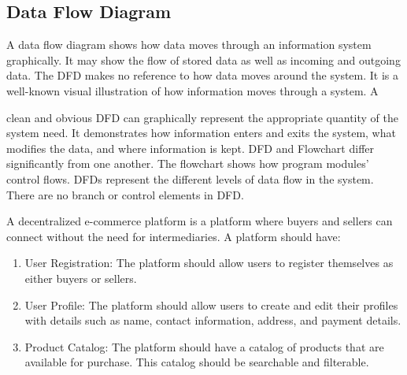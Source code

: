 \documentclass[a4paper,11pt]{article}
\begin{document}
\begin{center}
 \section{Data Flow Diagram}
A data flow diagram shows how data moves through an information system graphically. It may show the flow of stored data as well as incoming and outgoing data. The DFD makes no reference to how data moves around the system. It is a well-known visual illustration of how information moves through a system. A

clean and obvious DFD can graphically represent the appropriate quantity of the system need. It demonstrates how information enters and exits the system, what modifies the data, and where information is kept.
DFD and Flowchart differ significantly from one another. The flowchart shows how program modules' control flows. DFDs represent the different levels of data flow in the system. There are no branch or control elements in DFD.
 
 A decentralized e-commerce platform is a platform where buyers and sellers can connect without the need for intermediaries. A platform should have:

\begin{enumerate}
        \item User Registration: The platform should allow users to register themselves as either buyers or sellers. \\
    
    \item User Profile: The platform should allow users to create and edit their profiles with details such as name, contact information, address, and payment details. \\

    \item  Product Catalog: The platform should have a catalog of products that are available for purchase. This catalog should be searchable and filterable.


\end{enumerate}
\end{center}
\end{document}
